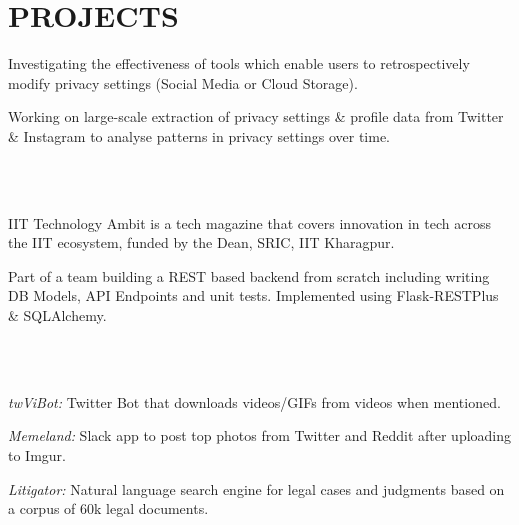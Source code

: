 \documentclass[]{deedy-resume-openfont}
\begin{document}
\begin{minipage}[t]{0.66\textwidth} 



\section{PROJECTS}

\vspace{\topsep} %
\begin{tightemize}
\item Investigating the effectiveness of tools which enable users to retrospectively modify privacy settings (Social Media or Cloud Storage).
\item Working on large-scale extraction of privacy settings \& profile data from Twitter \& Instagram to analyse patterns in privacy settings over time. 
\end{tightemize}

\sectionsep
\\~\\

\begin{tightemize}
\item IIT Technology Ambit is a tech magazine that covers innovation in tech across the IIT ecosystem, funded by the Dean, SRIC, IIT Kharagpur.  
\item Part of a team building a REST based backend from scratch including writing DB Models, API Endpoints and unit tests. Implemented using Flask-RESTPlus & SQLAlchemy.
\end{tightemize}
\sectionsep

\\~\\


\begin{tightemize}
\item \emph{twViBot:} Twitter Bot that downloads videos/GIFs from videos when mentioned.
\item \emph{Memeland:} Slack app to post top photos from Twitter and Reddit after uploading to Imgur.
\item \emph{Litigator:} Natural language search engine for legal cases and judgments based on a corpus of 60k legal documents.



\end{tightemize}
\end{minipage}
\end{document}
